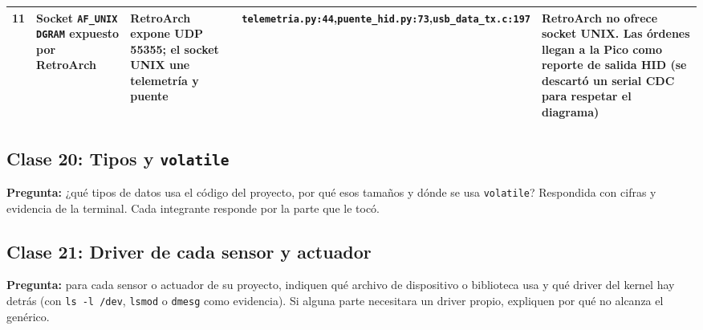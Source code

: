 \documentclass[conference]{IEEEtran}
\begin{document}
\begin{table}[!t]
\begin{tabular}{|p{1.2cm}|p{3.6cm}|p{3.8cm}|p{3.2cm}|p{3.8cm}|}
		\hline
		11 & Socket \texttt{AF\_UNIX DGRAM} expuesto por RetroArch & RetroArch expone UDP 55355; el socket UNIX une telemetría y puente & \texttt{telemetria.py:44},\newline\texttt{puente\_hid.py:73},\newline\texttt{usb\_data\_tx.c:197} & RetroArch no ofrece socket UNIX. Las órdenes llegan a la Pico como reporte de salida HID (se descartó un serial CDC para respetar el diagrama) \\
		\hline
	\end{tabular}
\end{table}

\subsection{Clase 20: Tipos y \texttt{volatile}}
\textbf{Pregunta:} ¿qué tipos de datos usa el código del proyecto, por qué esos tamaños y dónde se usa
\texttt{volatile}? Respondida con cifras y evidencia de la terminal. Cada integrante responde por la parte que le tocó.


\subsection{Clase 21: Driver de cada sensor y actuador}
\textbf{Pregunta:} para cada sensor o actuador de su proyecto, indiquen qué archivo de dispositivo o biblioteca
usa y qué driver del kernel hay detrás (con \texttt{ls -l /dev}, \texttt{lsmod} o \texttt{dmesg} como evidencia).
Si alguna parte necesitara un driver propio, expliquen por qué no alcanza el genérico.
\end{document}

